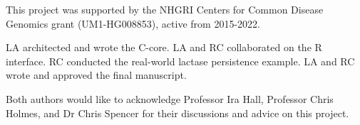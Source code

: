 \documentclass[pdflatex,referee,lineno,sn-nature]{sn-jnl}%
\providecommand{\DIFdelbegin}{} %
\newcommand{\DIFscaledelfig}{0.5}
\newlength{\DIFdelgraphicswidth} %
\newlength{\DIFdelgraphicsheight} %
\newcommand{\DIFdelincludegraphics}[2][]{%
\sbox{\DIFdelgraphicsbox}{\DIFOincludegraphics[#1]{#2}}%
\settoboxwidth{\DIFdelgraphicswidth}{\DIFdelgraphicsbox} %
\settoboxtotalheight{\DIFdelgraphicsheight}{\DIFdelgraphicsbox} %
\scalebox{\DIFscaledelfig}{%
\parbox[b]{\DIFdelgraphicswidth}{\usebox{\DIFdelgraphicsbox}\\[-\baselineskip] \rule{\DIFdelgraphicswidth}{0em}}\llap{\resizebox{\DIFdelgraphicswidth}{\DIFdelgraphicsheight}{%
\setlength{\unitlength}{\DIFdelgraphicswidth}%
\begin{picture}(1,1)%
\thicklines\linethickness{2pt} %
{\color[rgb]{1,0,0}\put(0,0){\framebox(1,1){}}}%
{\color[rgb]{1,0,0}\put(0,0){\line( 1,1){1}}}%
{\color[rgb]{1,0,0}\put(0,1){\line(1,-1){1}}}%
\end{picture}%
}\hspace*{3pt}}} %
} %
\DeclareRobustCommand{\DIFdelbegin}{\DIFOdelbegin \let\includegraphics\DIFdelincludegraphics} %
\begin{document}

This project was supported by the NHGRI Centers for Common Disease Genomics grant (UM1-HG008853), active from 2015-2022.


LA architected and wrote the C-core.
LA and RC collaborated on the R interface.
RC conducted the real-world lactase persistence example.
LA and RC wrote and approved the final manuscript.


Both authors would like to acknowledge Professor Ira Hall, Professor Chris Holmes, and Dr Chris Spencer for their discussions and advice on this project.




\DIFdelbegin %
\end{document}

